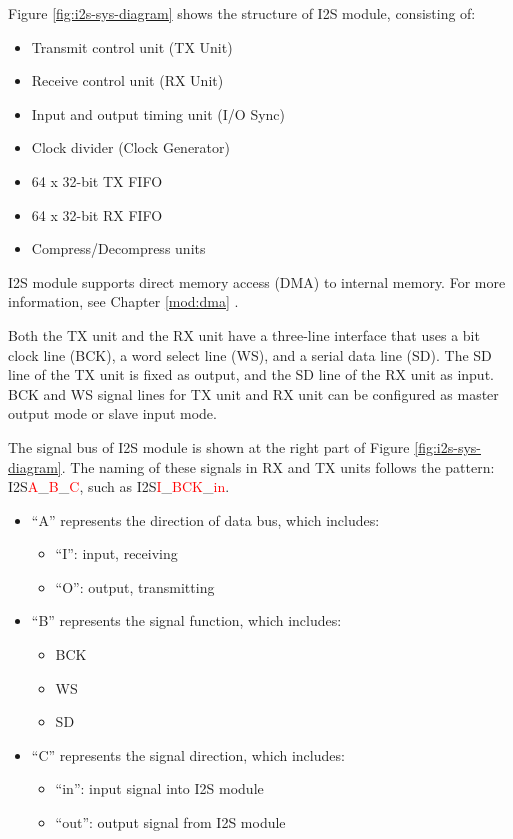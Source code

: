 \documentclass[main\_\_EN.tex]{subfiles}
\begin{document}
Figure \ref{fig:i2s-sys-diagram} shows the structure of \chipname{} I2S module, consisting of:
\begin{itemize}
    \item Transmit control unit (TX Unit)
    \item Receive control unit (RX Unit)
    \item Input and output timing unit (I/O Sync)
    \item Clock divider (Clock Generator)
    \item 64 x 32-bit TX FIFO
    \item 64 x 32-bit RX FIFO
    \item Compress/Decompress units
\end{itemize}
I2S module supports direct memory access (DMA) to internal memory. For more information, see Chapter \ref{mod:dma} \textit{}. 

Both the TX unit and the RX unit have a three-line interface that uses a bit clock line (BCK), a word select line (WS), and a serial data line (SD). The SD line of the TX unit is fixed as output, and the SD line of the RX unit as input. BCK and WS signal lines for TX unit and RX unit can be configured as master output mode or slave input mode.

The signal bus of I2S module is shown at the right part of Figure \ref{fig:i2s-sys-diagram}. The naming of these signals in RX and TX units follows the pattern: I2S\textcolor{red}{A}\_\textcolor{red}{B}\_\textcolor{red}{C}, such as I2S\textcolor{red}{I}\_\textcolor{red}{BCK}\_\textcolor{red}{in}.

\begin{itemize}
    \item ``A” represents the direction of data bus, which includes:
    \begin{itemize}
        \item ``I”: input, receiving
        \item ``O”: output, transmitting
    \end{itemize}
    \item ``B” represents the signal function, which includes:
    \begin{itemize}
        \item BCK
        \item WS
        \item SD
    \end{itemize}
    \item ``C” represents the signal direction, which includes:
    \begin{itemize}
        \item “in”: input signal into I2S module
        \item ``out”: output signal from I2S module
    \end{itemize}
\end{itemize}
\end{document}
